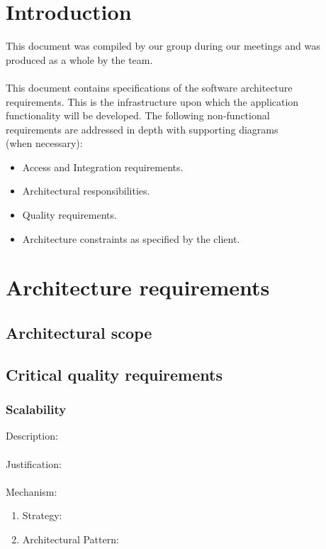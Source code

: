 \documentclass[a4paper,12pt,titlepage]{article}
\begin{document}



\newpage
\tableofcontents


\newpage
\section{Introduction}
\setlength{\voffset}{-3cm}
This document was compiled by our group during our meetings and was produced as a whole by the team.\\\\

This document contains specifications of the software architecture 
\\requirements. This is the infrastructure upon which the application
\\ functionality will be developed. The following non-functional
\\ requirements are addressed in depth with supporting diagrams
\\(when necessary):

\begin{itemize}
	\item Access and Integration requirements.
	\item Architectural responsibilities.
	\item Quality requirements.
	\item Architecture constraints as specified by the client. 
\end{itemize}

\newpage
\setlength{\voffset}{-3cm}

\section{Architecture requirements}
\subsection{Architectural scope}
\newpage
\subsection{Critical quality requirements}
\subsubsection{Scalability}%
	Description: \\\\
	Justification: \\\\
	Mechanism:
		\begin{enumerate}
			\item Strategy: 
			\item Architectural Pattern:
		\end{enumerate}
\end{document}

